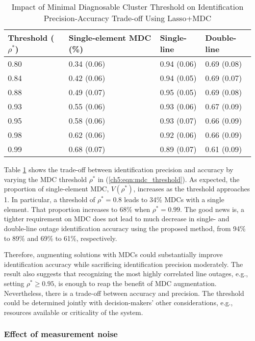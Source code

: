 \begin{table}[!htpb]
\caption{Impact of Minimal Diagnosable Cluster Threshold on Identification Precision-Accuracy Trade-off Using Lasso+MDC}
\label{ch5:tab:impact_mdc_threshold}
\centering
\begin{tabular}{llll}
\hline
\hline
Threshold ($\rho^*$)  & Single-element MDC (\%) & Single-line & Double-line \\
\hline
0.80 & 0.34 (0.06) & 0.94 (0.06) & 0.69 (0.08) \\
0.84 & 0.42 (0.06) & 0.94 (0.05) & 0.69 (0.07) \\
0.88 & 0.49 (0.07) & 0.95 (0.05) & 0.69 (0.08) \\
0.93 & 0.55 (0.06) & 0.93 (0.06) & 0.67 (0.09) \\
0.95 & 0.58 (0.06) & 0.93 (0.07) & 0.66 (0.09) \\
0.98 & 0.62 (0.06) & 0.92 (0.06) & 0.66 (0.09) \\
0.99 & 0.68 (0.07) & 0.89 (0.07) & 0.61 (0.09) \\
\hline 
\end{tabular}
\end{table}
Table \ref{ch5:tab:impact_mdc_threshold} shows the trade-off between identification precision and accuracy by varying the MDC threshold $\rho^*$ in (\ref{ch5:eqn:mdc_threshold}). As expected, the proportion of single-element MDC, $V(\rho^*)$, increases as the threshold approaches 1. In particular, a threshold of $\rho^* = 0.8$ leads to 34\% MDCs with a single element. That proportion increases to 68\% when $\rho^* = 0.99$. The good news is, a tighter requirement on MDC does not lead to much decrease in single- and double-line outage identification accuracy using the proposed method, from 94\% to 89\% and 69\% to 61\%, respectively. 

Therefore, augmenting solutions with MDCs could substantially improve identification accuracy while sacrificing identification precision moderately. The result also suggests that recognizing the most highly correlated line outages, e.g., setting $\rho^* \ge 0.95$, is enough to reap the benefit of MDC augmentation. Nevertheless, there is a trade-off between accuracy and precision. The threshold could be determined jointly with decision-makers' other considerations, e.g., resources available or criticality of the system. 

\subsubsection{Effect of measurement noise} 

